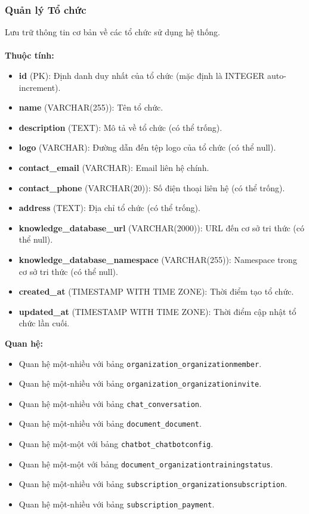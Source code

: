 \subsubsection{Quản lý Tổ chức}

 Lưu trữ thông tin cơ bản về các tổ chức sử dụng hệ thống. \\\\
\indent\textbf{Thuộc tính:}
\begin{itemize}
    \item \textbf{id} (PK): Định danh duy nhất của tổ chức (mặc định là INTEGER auto-increment).
    \item \textbf{name} (VARCHAR(255)): Tên tổ chức.
    \item \textbf{description} (TEXT): Mô tả về tổ chức (có thể trống).
    \item \textbf{logo} (VARCHAR): Đường dẫn đến tệp logo của tổ chức (có thể null).
    \item \textbf{contact\_email} (VARCHAR): Email liên hệ chính.
    \item \textbf{contact\_phone} (VARCHAR(20)): Số điện thoại liên hệ (có thể trống).
    \item \textbf{address} (TEXT): Địa chỉ tổ chức (có thể trống).
    \item \textbf{knowledge\_database\_url} (VARCHAR(2000)): URL đến cơ sở tri thức (có thể null).
    \item \textbf{knowledge\_database\_namespace} (VARCHAR(255)): Namespace trong cơ sở tri thức (có thể null).
    \item \textbf{created\_at} (TIMESTAMP WITH TIME ZONE): Thời điểm tạo tổ chức.
    \item \textbf{updated\_at} (TIMESTAMP WITH TIME ZONE): Thời điểm cập nhật tổ chức lần cuối.
\end{itemize}
\textbf{Quan hệ:}
\begin{itemize}
    \item Quan hệ một-nhiều với bảng \texttt{organization\_organizationmember}.
    \item Quan hệ một-nhiều với bảng \texttt{organization\_organizationinvite}.
    \item Quan hệ một-nhiều với bảng \texttt{chat\_conversation}.
    \item Quan hệ một-nhiều với bảng \texttt{document\_document}.
    \item Quan hệ một-một với bảng \texttt{chatbot\_chatbotconfig}.
    \item Quan hệ một-một với bảng \texttt{document\_organizationtrainingstatus}.
    \item Quan hệ một-nhiều với bảng \texttt{subscription\_organizationsubscription}.
    \item Quan hệ một-nhiều với bảng \texttt{subscription\_payment}.
\end{itemize}

